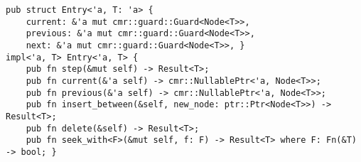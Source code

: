 \begin{lstlisting}[style=Rust,caption=Partial \code{Entry} API from the List implementation.,
                   label={lst:list-entry}]
pub struct Entry<'a, T: 'a> {
    current: &'a mut cmr::guard::Guard<Node<T>>,
    previous: &'a mut cmr::guard::Guard<Node<T>>,
    next: &'a mut cmr::guard::Guard<Node<T>>, }
impl<'a, T> Entry<'a, T> {
    pub fn step(&mut self) -> Result<T>;
    pub fn current(&'a self) -> cmr::NullablePtr<'a, Node<T>>;
    pub fn previous(&'a self) -> cmr::NullablePtr<'a, Node<T>>;
    pub fn insert_between(&self, new_node: ptr::Ptr<Node<T>>) -> Result<T>;
    pub fn delete(&self) -> Result<T>;
    pub fn seek_with<F>(&mut self, f: F) -> Result<T> where F: Fn(&T) -> bool; }\end{lstlisting}
